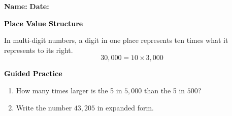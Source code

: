 \documentclass[12pt, letterpaper, fleqn]{article}
\begin{document}
\textbf{Name:} \underline{\hspace{5cm}}
\hfill
\textbf{Date:} \underline{\hspace{3cm}}\\

\begin{tcolorbox}[colback=customteal!20]
    \large\textcolor{black}{\textbf{Place Value Structure}}
\end{tcolorbox}
\vspace{3mm}
In multi-digit numbers, a digit in one place represents ten times what it represents to its right.
\[
30,000 = 10 \times 3,000
\]
\newpage
\begin{tcolorbox}[colback=customteal!20]
    \large\textcolor{black}{\textbf{Guided Practice}}
\end{tcolorbox}
\begin{enumerate}[itemsep=3.5cm, leftmargin=0.6cm]
\item How many times larger is the 5 in $5,000$ than the 5 in $500$?
\vspace{3cm}
\item Write the number $43,205$ in expanded form.
\end{enumerate}
\end{document}
